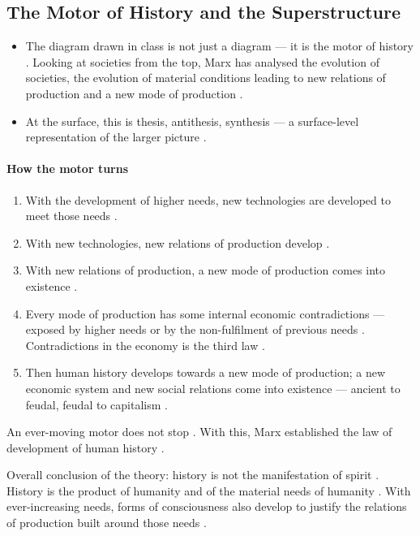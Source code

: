 \subsection{The Motor of History and the Superstructure}
\begin{itemize}
    \item The diagram drawn in class is not just a diagram --- it is the motor of history . Looking at societies from the top, Marx has analysed the evolution of societies, the evolution of material conditions leading to new relations of production and a new mode of production .
    \item At the surface, this is thesis, antithesis, synthesis --- a surface-level representation of the larger picture .
\end{itemize}

\paragraph{How the motor turns}
\begin{enumerate}
    \item With the development of higher needs, new technologies are developed to meet those needs .
    \item With new technologies, new relations of production develop .
    \item With new relations of production, a new mode of production comes into existence .
    \item Every mode of production has some internal economic contradictions --- exposed by higher needs or by the non-fulfilment of previous needs . Contradictions in the economy is the third law .
    \item Then human history develops towards a new mode of production; a new economic system and new social relations come into existence --- ancient to feudal, feudal to capitalism .
\end{enumerate}
An ever-moving motor does not stop . With this, Marx established the law of development of human history .

\begin{KeyConcept}
Overall conclusion of the theory: history is not the manifestation of spirit . History is the product of humanity and of the material needs of humanity . With ever-increasing needs, forms of consciousness also develop to justify the relations of production built around those needs .
\end{KeyConcept}


